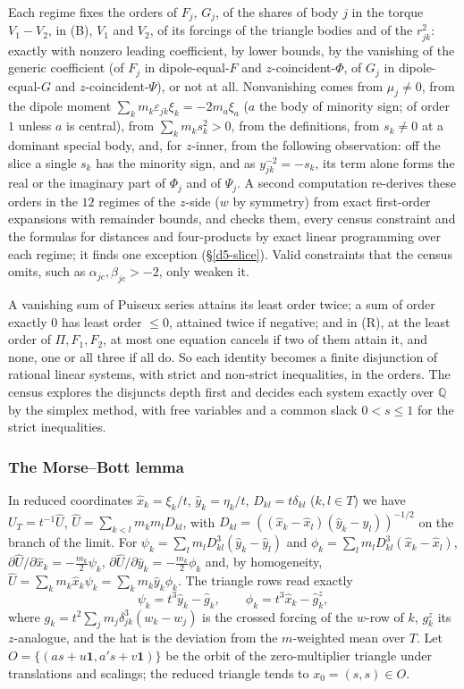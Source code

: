 Each regime fixes the orders of $F_j$, $G_j$, of the shares of body $j$ in the torque
$V_1-V_2$, in (B), $V_1$ and $V_2$, of its forcings of the triangle bodies and of the $r_{jk}^2$:
exactly with nonzero leading coefficient, by lower bounds, by the vanishing of the generic
coefficient (of $F_j$ in dipole-equal-$F$ and $z$-coincident-$\Phi$, of $G_j$ in dipole-equal-$G$
and $z$-coincident-$\Psi$), or not at all.  Nonvanishing comes from $\mu_j\ne0$, from the dipole
moment $\sum_km_k\varepsilon_{jk}\xi_k=-2m_a\xi_a$ ($a$ the body of minority sign; of order $1$ unless
$a$ is central), from $\sum_km_ks_k^2>0$, from the definitions, from $s_k\ne0$ at a dominant special
body, and, for $z$-inner, from the following observation: off the slice a single $s_k$ has the
minority sign, and as $y_{jk}^{-2}=-s_k$, its term alone forms the real or the imaginary part of
$\Phi_j$ and of $\Psi_j$.  A second computation re-derives these orders in the $12$ regimes of the $z$-side ($w$ by
symmetry) from exact first-order expansions with remainder bounds, and checks them, every census
constraint and the formulas for distances and four-products by exact linear programming over each
regime; it finds one exception (\S\ref{d5-slice}).  Valid constraints that the census omits, such
as $\alpha_{jc},\beta_{jc}>-2$, only weaken it.

A vanishing sum of Puiseux series attains its least order twice; a sum of order exactly $0$ has
least order $\le0$, attained twice if negative; and in (R), at the least order of $\Pi,F_1,F_2$, at
most one equation cancels if two of them attain it, and none, one or all three if all do.  So
each identity becomes a finite disjunction of rational linear systems, with strict and non-strict
inequalities, in the orders.  The census explores the disjuncts depth first and decides each
system exactly over $\mathbb Q$ by the simplex method, with free variables and a common slack
$0<s\le1$ for the strict inequalities.

\subsubsection{The Morse--Bott lemma}\label{d5-mb}
In reduced coordinates $\hat x_k=\xi_k/t$, $\hat y_k=\eta_k/t$, $D_{kl}=t\delta_{kl}$ ($k,l\in T$)
we have $U_T=t^{-1}\hat U$, $\hat U=\sum_{k<l}m_km_lD_{kl}$, with
$D_{kl}=((\hat x_k-\hat x_l)(\hat y_k-\hat y_l))^{-1/2}$ on the branch of the limit.  For
$\psi_k=\sum_lm_lD_{kl}^3(\hat y_k-\hat y_l)$ and $\phi_k=\sum_lm_lD_{kl}^3(\hat x_k-\hat x_l)$,
$\partial\hat U/\partial\hat x_k=-\frac{m_k}2\psi_k$, $\partial\hat U/\partial\hat y_k=-\frac{m_k}2\phi_k$
and, by homogeneity, $\hat U=\sum_km_k\hat x_k\psi_k=\sum_km_k\hat y_k\phi_k$.  The triangle rows
read exactly
\begin{equation}\label{d5-eq-rows}
  \psi_k=t^3\hat y_k-\hat g_k,\qquad \phi_k=t^3\hat x_k-\hat g^z_k,
\end{equation}
where $g_k=t^2\sum_jm_j\delta_{jk}^3(w_k-w_j)$ is the crossed forcing of the $w$-row of $k$,
$g^z_k$ its $z$-analogue, and the hat is the deviation from the $m$-weighted mean over $T$.  Let
$O=\{(as+u\mathbf 1,a's+v\mathbf 1)\}$ be the orbit of the zero-multiplier triangle under
translations and scalings; the reduced triangle tends to $x_0=(s,s)\in O$.

